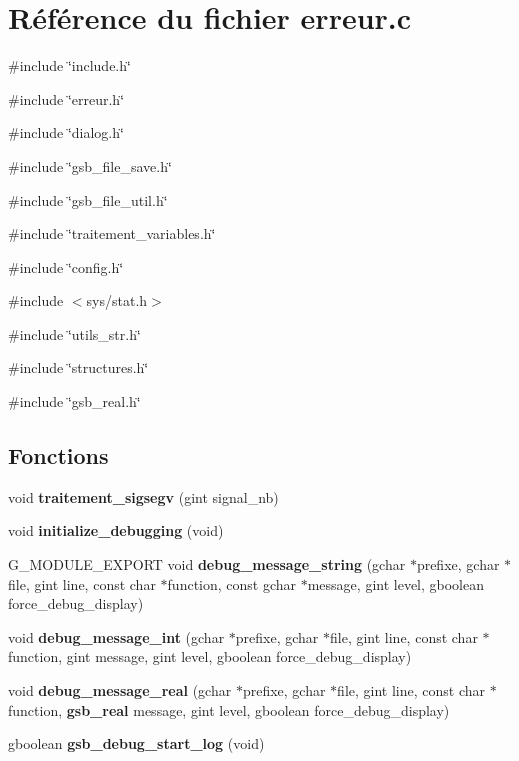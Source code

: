 \section{Référence du fichier erreur.c}
\label{erreur_8c}
{\ttfamily \#include \char`\"{}include.h\char`\"{}}\par
{\ttfamily \#include \char`\"{}erreur.h\char`\"{}}\par
{\ttfamily \#include \char`\"{}dialog.h\char`\"{}}\par
{\ttfamily \#include \char`\"{}gsb\_\-file\_\-save.h\char`\"{}}\par
{\ttfamily \#include \char`\"{}gsb\_\-file\_\-util.h\char`\"{}}\par
{\ttfamily \#include \char`\"{}traitement\_\-variables.h\char`\"{}}\par
{\ttfamily \#include \char`\"{}config.h\char`\"{}}\par
{\ttfamily \#include $<$sys/stat.h$>$}\par
{\ttfamily \#include \char`\"{}utils\_\-str.h\char`\"{}}\par
{\ttfamily \#include \char`\"{}structures.h\char`\"{}}\par
{\ttfamily \#include \char`\"{}gsb\_\-real.h\char`\"{}}\par
\subsection*{Fonctions}
\begin{DoxyCompactItemize}
\item 
void {\bf traitement\_\-sigsegv} (gint signal\_\-nb)
\item 
void {\bf initialize\_\-debugging} (void)
\item 
G\_\-MODULE\_\-EXPORT void {\bf debug\_\-message\_\-string} (gchar $\ast$prefixe, gchar $\ast$file, gint line, const char $\ast$function, const gchar $\ast$message, gint level, gboolean force\_\-debug\_\-display)
\item 
void {\bf debug\_\-message\_\-int} (gchar $\ast$prefixe, gchar $\ast$file, gint line, const char $\ast$function, gint message, gint level, gboolean force\_\-debug\_\-display)
\item 
void {\bf debug\_\-message\_\-real} (gchar $\ast$prefixe, gchar $\ast$file, gint line, const char $\ast$function, {\bf gsb\_\-real} message, gint level, gboolean force\_\-debug\_\-display)
\item 
gboolean {\bf gsb\_\-debug\_\-start\_\-log} (void)
\end{DoxyCompactItemize}
